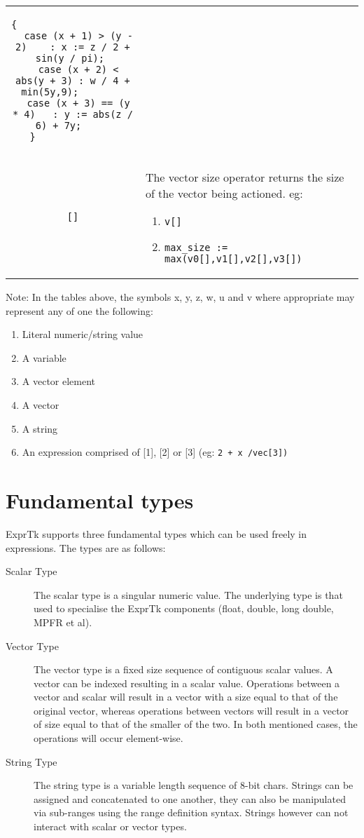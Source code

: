 \begin{tabular}{|c|p{}|}
\begin{verbatim}
{                                                       
  case (x + 1) > (y - 2)    : x := z / 2 + sin(y / pi); 
  case (x + 2) < abs(y + 3) : w / 4 + min(5y,9);        
  case (x + 3) == (y * 4)   : y := abs(z / 6) + 7y;     
}              
\end{verbatim}
\\
\verb'[]'& The vector size operator returns the size of the vector 
being actioned.                         
eg:
\begin{enumerate}
\item\verb"v[]"                                 
\item\verb"max_size := max(v0[],v1[],v2[],v3[])"
\end{enumerate}
\\
\hline
\end{tabular}

Note: In  the  tables  above, the  symbols x, y, z, w, u  and v  where
appropriate may represent any of one the following:

\begin{enumerate}
  \item Literal numeric/string value
   \item A variable
   \item A vector element
   \item A vector
   \item A string
   \item An expression comprised of [1], [2] or [3] (eg: \verb'2 + x /vec[3])' 
\end{enumerate}


\section{Fundamental types}
ExprTk supports three fundamental types which can be used freely in
expressions. The types are as follows:

\begin{description}
\item[Scalar Type]
The scalar type  is a singular  numeric value. The  underlying type is
that used  to specialise  the ExprTk  components (float,  double, long
double, MPFR et al).


\item[Vector Type]
The vector type is a fixed size sequence of contiguous scalar  values.
A  vector  can be  indexed  resulting in  a  scalar value.  Operations
between a vector and scalar will result in a vector with a size  equal
to that  of the  original vector,  whereas operations  between vectors
will result in a  vector of size equal  to that of the  smaller of the
two. In both mentioned cases, the operations will occur element-wise.


\item[String Type]
The string type is a variable length sequence of 8-bit chars.  Strings
can be  assigned and  concatenated to  one another,  they can  also be
manipulated via sub-ranges using the range definition syntax.  Strings
however can not interact with scalar or vector types.

\end{description}
